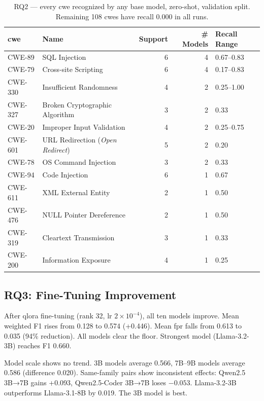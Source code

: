 \begin{table}[H]
\centering
\caption{RQ2 --- every \gls{cwe} recognized by any base model, zero-shot, validation split. Remaining 108 \glspl{cwe} have recall 0.000 in all runs.}
\label{tab:rq2}
\footnotesize
\begin{tabular}{l l r r l}
\toprule
\textbf{\gls{cwe}} & \textbf{Name} & \textbf{Support} & \textbf{\# Models} & \textbf{Recall Range} \\
\midrule
CWE-89  & SQL Injection & 6 & 4 & 0.67--0.83 \\
CWE-79  & Cross-site Scripting & 6 & 4 & 0.17--0.83 \\
CWE-330 & Insufficient Randomness & 4 & 2 & 0.25--1.00 \\
CWE-327 & Broken Cryptographic Algorithm & 3 & 2 & 0.33 \\
CWE-20  & Improper Input Validation & 4 & 2 & 0.25--0.75 \\
CWE-601 & URL Redirection (\emph{Open Redirect}) & 5 & 2 & 0.20 \\
CWE-78  & OS Command Injection & 3 & 2 & 0.33 \\
CWE-94  & Code Injection & 6 & 1 & 0.67 \\
CWE-611 & XML External Entity & 2 & 1 & 0.50 \\
CWE-476 & NULL Pointer Dereference & 2 & 1 & 0.50 \\
CWE-319 & Cleartext Transmission & 3 & 1 & 0.33 \\
CWE-200 & Information Exposure & 4 & 1 & 0.25 \\
\bottomrule
\end{tabular}
\end{table}

\subsection{RQ3: Fine-Tuning Improvement}

After \gls{qlora} fine-tuning (rank 32, lr $2\times10^{-4}$), all ten models improve. Mean weighted F1 rises from 0.128 to 0.574 (+0.446). Mean \gls{fpr} falls from 0.613 to 0.035 (94\% reduction). All models clear the floor. Strongest model (Llama-3.2-3B) reaches F1 0.660.

Model scale shows no trend. 3B models average 0.566, 7B--9B models average 0.586 (difference 0.020). Same-family pairs show inconsistent effects: Qwen2.5 3B→7B gains +0.093, Qwen2.5-Coder 3B→7B loses $-0.053$. Llama-3.2-3B outperforms Llama-3.1-8B by 0.019. The 3B model is best.

